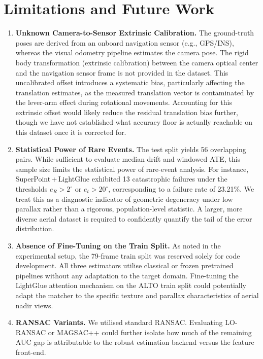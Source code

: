 \documentclass[11pt,a4paper]{article}
\begin{document}
\section{Limitations and Future Work}
\begin{enumerate}
\item \textbf{Unknown Camera-to-Sensor Extrinsic Calibration.}
The ground-truth poses are derived from an onboard navigation sensor (e.g., GPS/INS), 
whereas the visual odometry pipeline estimates the camera pose. The rigid body 
transformation (extrinsic calibration) between the camera optical center and the navigation sensor 
frame is not provided in the dataset. This uncalibrated offset introduces a systematic bias, 
particularly affecting the translation estimates, as the measured translation vector is contaminated 
by the lever-arm effect during rotational movements. Accounting for this extrinsic offset would likely reduce 
the residual translation bias further, though we have not established what accuracy floor is actually reachable 
on this dataset once it is corrected for.

\item \textbf{Statistical Power of Rare Events.}
The test split yields 56 overlapping pairs. While sufficient to evaluate median drift and windowed ATE, 
this sample size limits the statistical power of rare-event analysis. For instance, SuperPoint\,+\,LightGlue 
exhibited 13 catastrophic failures under the thresholds $e_R > 2^\circ$ or $e_t > 20^\circ$, corresponding 
to a failure rate of 23.21\%. We treat this as a diagnostic indicator of geometric degeneracy under low parallax 
rather than a rigorous, population-level statistic. A larger, more diverse aerial dataset is required to 
confidently quantify the tail of the error distribution.

\item \textbf{Absence of Fine-Tuning on the Train Split.}
As noted in the experimental setup, the 79-frame train split was reserved solely for code development. 
All three estimators utilise classical or frozen pretrained pipelines without any adaptation to the target 
domain. Fine-tuning the LightGlue attention mechanism on the ALTO train split could potentially adapt the 
matcher to the specific texture and parallax characteristics of aerial nadir views.

\item \textbf{RANSAC Variants.}
We utilised standard RANSAC. Evaluating LO-RANSAC or MAGSAC++ could further isolate how much of the 
remaining AUC gap is attributable to the robust estimation backend versus the feature front-end.
\end{enumerate}
\end{document}
